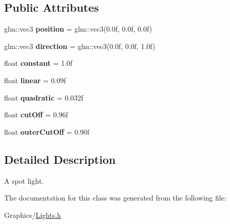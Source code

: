 \subsection*{Public Attributes}
\begin{DoxyCompactItemize}
\item 
\mbox{\label{classce_1_1graphics_1_1_spot_light_a84a6b12c9c9a761d54672d68bcf5e2b0}} 
glm\+::vec3 {\bfseries position} = glm\+::vec3(0.\+0f, 0.\+0f, 0.\+0f)
\item 
\mbox{\label{classce_1_1graphics_1_1_spot_light_a18634cf5c779fd34efb3298774f02d24}} 
glm\+::vec3 {\bfseries direction} = glm\+::vec3(0.\+0f, 0.\+0f, 1.\+0f)
\item 
\mbox{\label{classce_1_1graphics_1_1_spot_light_a6cb09e93a8cc20ba0f6ed21fcfc0f720}} 
float {\bfseries constant} = 1.\+0f
\item 
\mbox{\label{classce_1_1graphics_1_1_spot_light_af9bd65024e9ee84e0a2aae9dda6a8807}} 
float {\bfseries linear} = 0.\+09f
\item 
\mbox{\label{classce_1_1graphics_1_1_spot_light_a6afbb4be9fda216b86dfba608aa4c2dd}} 
float {\bfseries quadratic} = 0.\+032f
\item 
\mbox{\label{classce_1_1graphics_1_1_spot_light_af4b4eac01e5396be4a95fdf09e86363c}} 
float {\bfseries cut\+Off} = 0.\+96f
\item 
\mbox{\label{classce_1_1graphics_1_1_spot_light_a0cb85ec1332296f31b744b5aaa326c1b}} 
float {\bfseries outer\+Cut\+Off} = 0.\+90f
\end{DoxyCompactItemize}


\subsection{Detailed Description}
A spot light. 

The documentation for this class was generated from the following file\+:\begin{DoxyCompactItemize}
\item 
Graphics/\hyperlink{_lights_8h}{Lights.\+h}\end{DoxyCompactItemize}
